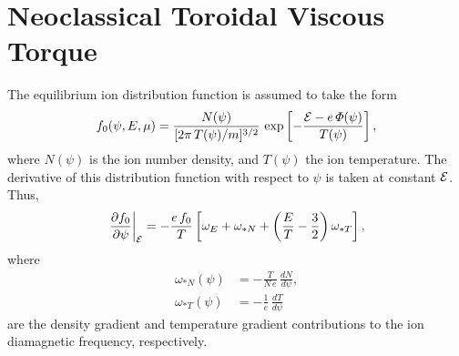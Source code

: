 \documentclass[12pt,prb,aps,notitlepage]{revtex4-1}
\begin{document}
\section{Neoclassical Toroidal Viscous Torque}
The equilibrium ion distribution function is assumed to take the form 
\begin{equation}
f_0(\psi,E,\mu) = \frac{N(\psi)}{[2\pi\,T(\psi)/m]^{3/2}}\,\exp\left[-\frac{{\cal E}-e\,{\mit\Phi}(\psi)}{T(\psi)}\right],
\end{equation} 
where $N(\psi)$ is the ion number density, and $T(\psi)$ the ion temperature. The derivative of this distribution function with respect to $\psi$ is
taken at constant ${\cal E}$. Thus, 
\begin{equation}
\left.\frac{\partial f_0}{\partial\psi}\right|_{\cal E}= -\frac{e\,f_0}{T}\left[\omega_E +\omega_{\ast N}+ \left(\frac{E}{T}-\frac{3}{2}\right)\omega_{\ast T}\right],
\end{equation}
where
\begin{align}
\omega_{\ast N}(\psi)&= - \frac{T}{N\,e}\,\frac{dN}{d\psi},\\[0.5ex]
\omega_{\ast T}(\psi)&=-\frac{1}{e}\,\frac{dT}{d\psi}
\end{align}
are the density gradient and temperature gradient contributions to the ion diamagnetic frequency, respectively. 
  
\end{document}
